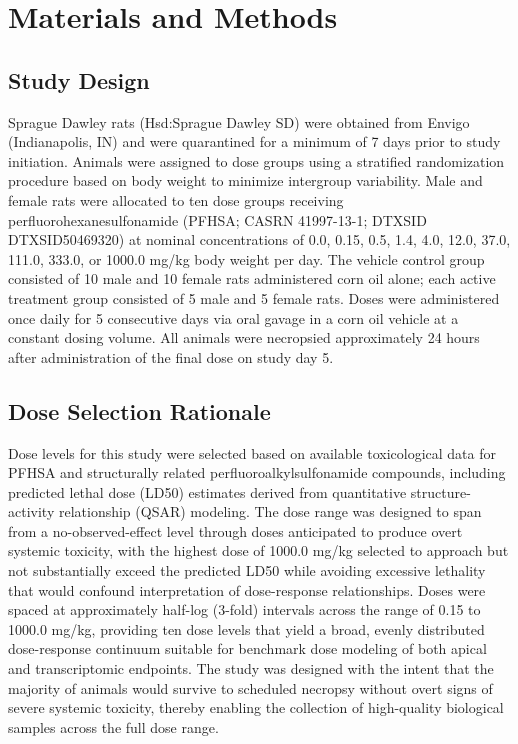 \section{Materials and Methods}

\subsection{Study Design}

Sprague Dawley rats (Hsd:Sprague Dawley SD) were obtained from Envigo (Indianapolis, IN) and were quarantined for a minimum of 7 days prior to study initiation. Animals were assigned to dose groups using a stratified randomization procedure based on body weight to minimize intergroup variability. Male and female rats were allocated to ten dose groups receiving perfluorohexanesulfonamide (PFHSA; CASRN 41997-13-1; DTXSID DTXSID50469320) at nominal concentrations of 0.0, 0.15, 0.5, 1.4, 4.0, 12.0, 37.0, 111.0, 333.0, or 1000.0 mg/kg body weight per day. The vehicle control group consisted of 10 male and 10 female rats administered corn oil alone; each active treatment group consisted of 5 male and 5 female rats. Doses were administered once daily for 5 consecutive days via oral gavage in a corn oil vehicle at a constant dosing volume. All animals were necropsied approximately 24 hours after administration of the final dose on study day 5.

\subsection{Dose Selection Rationale}

Dose levels for this study were selected based on available toxicological data for PFHSA and structurally related perfluoroalkylsulfonamide compounds, including predicted lethal dose (LD50) estimates derived from quantitative structure-activity relationship (QSAR) modeling. The dose range was designed to span from a no-observed-effect level through doses anticipated to produce overt systemic toxicity, with the highest dose of 1000.0 mg/kg selected to approach but not substantially exceed the predicted LD50 while avoiding excessive lethality that would confound interpretation of dose-response relationships. Doses were spaced at approximately half-log (3-fold) intervals across the range of 0.15 to 1000.0 mg/kg, providing ten dose levels that yield a broad, evenly distributed dose-response continuum suitable for benchmark dose modeling of both apical and transcriptomic endpoints. The study was designed with the intent that the majority of animals would survive to scheduled necropsy without overt signs of severe systemic toxicity, thereby enabling the collection of high-quality biological samples across the full dose range.


